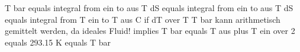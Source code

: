 T bar equals integral from ein to aus T dS equals integral from ein to aus T dS  
equals integral from T ein to T aus C if dT over T  
T bar kann arithmetisch gemittelt werden, da ideales Fluid!  
implies T bar equals T aus plus T ein over 2 equals 293.15 K equals T bar